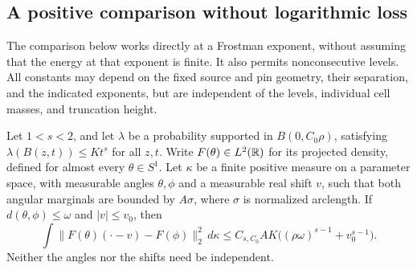 \subsection{A positive comparison without logarithmic loss}
\label{band:section}

The comparison below works directly at a Frostman exponent, without
assuming that the energy at that exponent is finite. It also permits
nonconsecutive levels. All constants may depend on the fixed source and
pin geometry, their separation, and the indicated exponents, but are
independent of the levels, individual cell masses, and truncation height.

\begin{lemma}\label{band:lemma}
Let \(1<s<2\), and let \(\lambda\) be a probability supported in
\(B(0,C_0\rho)\), satisfying
\(\lambda(B(z,t))\leq Kt^s\) for all \(z,t\).
Write \(F(\theta)\in L^2(\mathbb R)\) for its projected density, defined for
almost every \(\theta\in S^1\). Let \(\kappa\) be a finite positive measure
on a parameter space, with measurable angles \(\theta,\phi\) and a
measurable real shift \(v\), such that both angular marginals are bounded
by \(A\sigma\), where \(\sigma\) is normalized arclength. If
\(d(\theta,\phi)\leq\omega\) and \(|v|\leq v_0\), then
\begin{equation}\label{band:lemma-bound}
\int\|F(\theta)(\cdot-v)-F(\phi)\|_2^2\,d\kappa
\leq C_{s,C_0}AK\bigl((\rho\omega)^{s-1}+v_0^{s-1}\bigr).
\end{equation}
Neither the angles nor the shifts need be independent.
\end{lemma}
